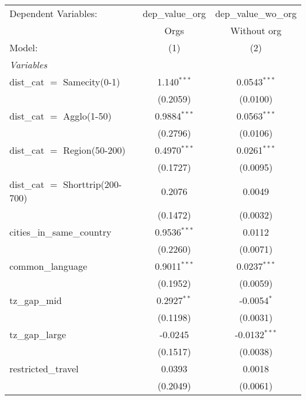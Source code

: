 
\begingroup
\centering
\begin{tabular}{lcc}
   \tabularnewline \midrule \midrule
   Dependent Variables:              & dep\_value\_org   & dep\_value\_wo\_org\\     
                                     & Orgs              & Without org \\   
   Model:                            & (1)               & (2)\\  
   \midrule
   \emph{Variables}\\
   dist\_cat $=$ Samecity(0-1)       & 1.140$^{***}$     & 0.0543$^{***}$\\   
                                     & (0.2059)          & (0.0100)\\   
   dist\_cat $=$ Agglo(1-50)         & 0.9884$^{***}$    & 0.0563$^{***}$\\   
                                     & (0.2796)          & (0.0106)\\   
   dist\_cat $=$ Region(50-200)      & 0.4970$^{***}$    & 0.0261$^{***}$\\   
                                     & (0.1727)          & (0.0095)\\   
   dist\_cat $=$ Shorttrip(200-700)  & 0.2076            & 0.0049\\   
                                     & (0.1472)          & (0.0032)\\   
   cities\_in\_same\_country         & 0.9536$^{***}$    & 0.0112\\   
                                     & (0.2260)          & (0.0071)\\   
   common\_language                  & 0.9011$^{***}$    & 0.0237$^{***}$\\   
                                     & (0.1952)          & (0.0059)\\   
   tz\_gap\_mid                      & 0.2927$^{**}$     & -0.0054$^{*}$\\   
                                     & (0.1198)          & (0.0031)\\   
   tz\_gap\_large                    & -0.0245           & -0.0132$^{***}$\\   
                                     & (0.1517)          & (0.0038)\\   
   restricted\_travel                & 0.0393            & 0.0018\\   
                                     & (0.2049)          & (0.0061)\\   

\end{tabular}
